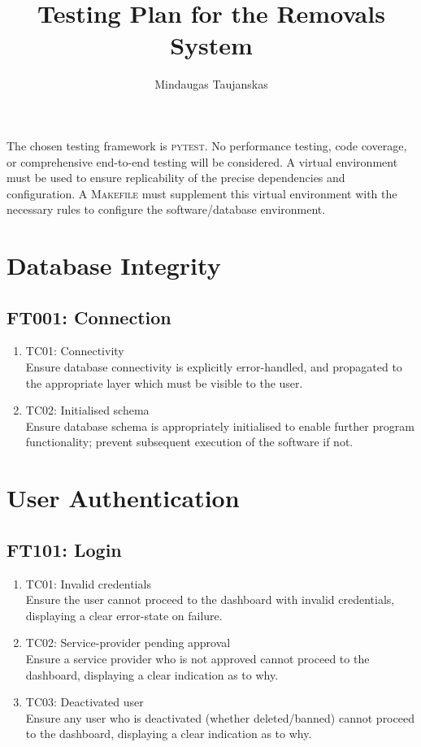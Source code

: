 \documentclass[journal]{IEEEtran}
\begin{document}
	
	\title{Testing Plan for the Removals System}
	
	\author{Mindaugas Taujanskas}
	
	\maketitle
	
	The chosen testing framework is \textsc{pytest}. No performance testing, code coverage, or comprehensive end-to-end testing will be considered. A virtual environment must be used to ensure replicability of the precise dependencies and configuration. A \textsc{Makefile} must supplement this virtual environment with the necessary rules to configure the software/database environment.
	
	\section{Database Integrity}
	\subsection{\textsc{FT001:} Connection}
	\begin{enumerate}
		\item \textsc{TC01:} Connectivity\\
		Ensure database connectivity is explicitly error-handled, and propagated to the appropriate layer which must be visible to the user.
		\item \textsc{TC02:} Initialised schema\\
		Ensure database schema is appropriately initialised to enable further program functionality; prevent subsequent execution of the software if not.
	\end{enumerate}
	
	\section{User Authentication}
	\subsection{\textsc{FT101:} Login}
	\begin{enumerate}
		\item \textsc{TC01:} Invalid credentials\\
		Ensure the user cannot proceed to the dashboard with invalid credentials, displaying a clear error-state on failure.
		\item \textsc{TC02:} Service-provider pending approval\\
		Ensure a service provider who is not approved cannot proceed to the dashboard, displaying a clear indication as to why.
		\item \textsc{TC03:} Deactivated user\\
		Ensure any user who is deactivated (whether deleted/banned) cannot proceed to the dashboard, displaying a clear indication as to why.
	\end{enumerate}
	
\end{document}

